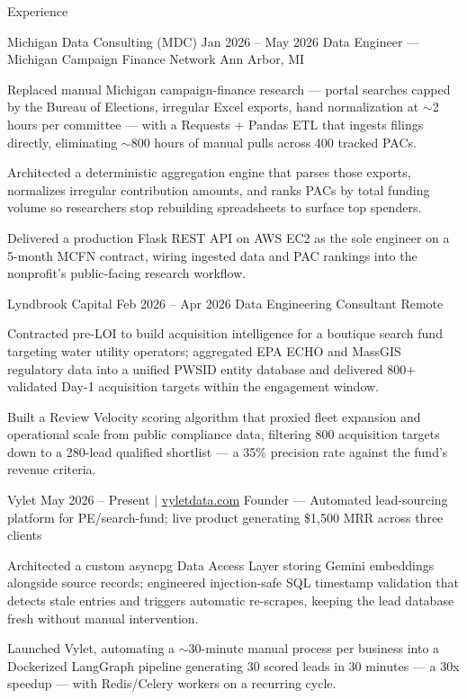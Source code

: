 \documentclass[
	11pt
]{../../../template}
\begin{document}
	\begin{rSection}{E}{xperience}
		\begin{rSectionEntry}
			{Michigan Data Consulting (MDC)}
			{Jan 2026 -- May 2026}
			{Data Engineer --- Michigan Campaign Finance Network}
			{}
			{Ann Arbor, MI}

			\item Replaced manual Michigan campaign-finance research --- portal searches capped by the Bureau of Elections, irregular Excel exports, hand normalization at $\sim$2 hours per committee --- with a Requests + Pandas ETL that ingests filings directly, eliminating $\sim$800 hours of manual pulls across 400 tracked PACs.
			\item Architected a deterministic aggregation engine that parses those exports, normalizes irregular contribution amounts, and ranks PACs by total funding volume so researchers stop rebuilding spreadsheets to surface top spenders.
			\item Delivered a production Flask REST API on AWS EC2 as the sole engineer on a 5-month MCFN contract, wiring ingested data and PAC rankings into the nonprofit's public-facing research workflow.
		\end{rSectionEntry}

		\begin{rSectionEntry}
			{Lyndbrook Capital}
			{Feb 2026 -- Apr 2026}
			{Data Engineering Consultant}
			{}
			{Remote}

			\item Contracted pre-LOI to build acquisition intelligence for a boutique search fund targeting water utility operators; aggregated EPA ECHO and MassGIS regulatory data into a unified PWSID entity database and delivered 800+ validated Day-1 acquisition targets within the engagement window.
			\item Built a Review Velocity scoring algorithm that proxied fleet expansion and operational scale from public compliance data, filtering 800 acquisition targets down to a 280-lead qualified shortlist --- a 35\% precision rate against the fund's revenue criteria.
		\end{rSectionEntry}

		\begin{rSectionEntry}
			{Vylet}
			{May 2026 -- Present $\vert$ \href{https://vyletdata.com}{vyletdata.com}}
			{Founder --- Automated lead-sourcing platform for PE/search-fund; live product generating \$1,500 MRR across three clients}
			{}
			{}

			\item Architected a custom asyncpg Data Access Layer storing Gemini embeddings alongside source records; engineered injection-safe SQL timestamp validation that detects stale entries and triggers automatic re-scrapes, keeping the lead database fresh without manual intervention.
			\item Launched Vylet, automating a $\sim$30-minute manual process per business into a Dockerized LangGraph pipeline generating 30 scored leads in 30 minutes --- a 30x speedup --- with Redis/Celery workers on a recurring cycle.
		\end{rSectionEntry}

	\end{rSection}
\end{document}
